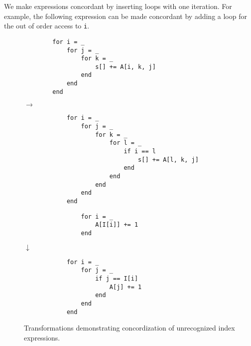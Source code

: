     We make expressions concordant by inserting loops with one iteration. For example, the following expression can be made concordant by adding a loop for the out of order access to \texttt{i}.
    \begin{figure}[htbp]
        \centering %
        \begin{minipage}{0.3\textwidth}
        \begin{verbatim}
        for i = _
            for j = _
                for k = _
                    s[] += A[i, k, j]
                end
            end
        end
        \end{verbatim}
        \end{minipage}
        $\rightarrow$
        \begin{minipage}{0.4\textwidth}
        \begin{verbatim}
            for i = _
                for j = _
                    for k = _
                        for l = _
                            if i == l
                                s[] += A[l, k, j]
                            end
                        end
                    end
                end
            end
        \end{verbatim}
        \end{minipage}\hfill%
        \begin{minipage}{0.2\textwidth}
            \begin{verbatim}
                for i = _
                    A[I[i]] += 1
                end
                \end{verbatim}
            $\downarrow$
            \begin{verbatim}
            for i = _
                for j = _
                    if j == I[i]
                        A[j] += 1
                    end
                end
            end
            \end{verbatim}
        \end{minipage}
        
        \caption{Transformations demonstrating concordization of unrecognized index expressions.}
        \end{figure}
